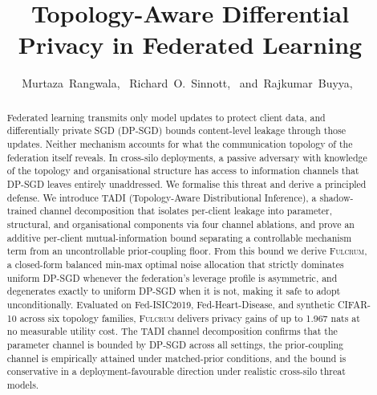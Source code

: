 \documentclass[letterpaper,journal]{IEEEtran}
\newcommand{\TADI}{\textsc{TADI}\xspace}
\newcommand{\Fulcrum}{\textsc{Fulcrum}\xspace}
\begin{document}

\title{Topology-Aware Differential Privacy in Federated Learning}

\author{Murtaza~Rangwala,~
        Richard~O.~Sinnott,~\IEEEmembership{}
        and~Rajkumar~Buyya,~
\\
}

\maketitle

\begin{abstract}
Federated learning transmits only model updates to protect client
data, and differentially private SGD (DP-SGD) bounds content-level
leakage through those updates. Neither mechanism accounts for what
the communication topology of the federation itself reveals. In
cross-silo deployments, a passive adversary with knowledge of the
topology and organisational structure has access to information
channels that DP-SGD leaves entirely unaddressed. We formalise this
threat and derive a principled defense. We introduce \TADI
(Topology-Aware Distributional Inference), a shadow-trained channel
decomposition that isolates per-client leakage into parameter,
structural, and organisational components via four channel ablations,
and prove an additive per-client mutual-information bound separating
a controllable mechanism term from an uncontrollable prior-coupling
floor. From this bound we derive \Fulcrum, a closed-form balanced
min-max optimal noise allocation that strictly dominates uniform
DP-SGD whenever the federation's leverage profile is asymmetric, and
degenerates exactly to uniform DP-SGD when it is not, making it safe
to adopt unconditionally. Evaluated on Fed-ISIC2019,
Fed-Heart-Disease, and synthetic CIFAR-10 across six topology
families, \Fulcrum delivers privacy gains of up to 1.967 nats at no
measurable utility cost. The \TADI channel decomposition confirms
that the parameter channel is bounded by DP-SGD across all settings,
the prior-coupling channel is empirically attained under
matched-prior conditions, and the bound is conservative in a
deployment-favourable direction under realistic cross-silo threat
models.
\end{abstract}
\end{document}
